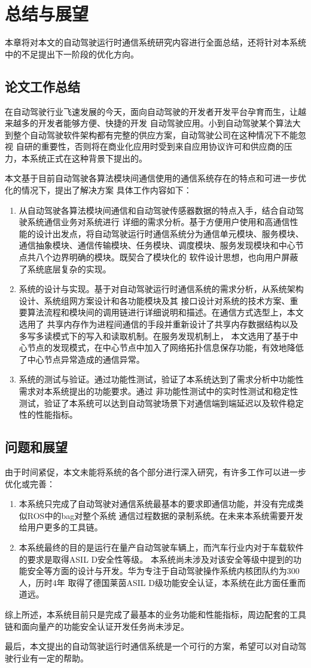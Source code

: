 \chapter{总结与展望}
本章将对本文的自动驾驶运行时通信系统研究内容进行全面总结，还将针对本系统中的不足提出下一阶段的优化方向。
\section{论文工作总结}
在自动驾驶行业飞速发展的今天，面向自动驾驶的开发者开发平台孕育而生，让越来越多的开发者能够方便、快捷的开发
自动驾驶应用。小到自动驾驶某个算法大到整个自动驾驶软件架构都有完整的供应方案，自动驾驶公司在这种情况下不能忽视
自研的重要性，否则将在商业化应用时受到来自应用协议许可和供应商的压力，本系统正式在这种背景下提出的。

本文基于目前自动驾驶各算法模块间通信使用的通信系统存在的特点和可进一步优化的情况下，提出了解决方案
具体工作内容如下：
\begin{enumerate}
    \item 从自动驾驶各算法模块间通信和自动驾驶传感器数据的特点入手，结合自动驾驶系统通信业务对系统进行
    详细的需求分析。基于方便用户使用和高通信性能的设计出发点，将自动驾驶运行时通信系统分为通信单元模块、服务模块、
    通信抽象模块、通信传输模块、任务模块、调度模块、服务发现模块和中心节点共八个边界明确的模块。既契合了模块化的
    软件设计思想，也向用户屏蔽了系统底层复杂的实现。
    \item 系统的设计与实现。基于对自动驾驶运行时通信系统的需求分析，从系统架构设计、系统组网方案设计和各功能模块及其
    接口设计对系统的技术方案、重要算法流程和模块间的调用链进行详细说明和描述。在通信方式选型上，本文选用了
    共享内存作为进程间通信的手段并重新设计了共享内存数据结构以及多写多读模式下的写入和读取机制。在服务发现机制上，
    本文选用了基于中心节点的发现模式，在中心节点中加入了网络拓扑信息保存功能，有效地降低了中心节点异常造成的通信异常。
    \item 系统的测试与验证。通过功能性测试，验证了本系统达到了需求分析中功能性需求对本系统提出的功能要求。通过
    非功能性测试中的实时性测试和稳定性测试，验证了本系统可以达到自动驾驶场景下对通信端到端延迟以及软件稳定性的性能指标。
\end{enumerate}

\section{问题和展望}
由于时间紧促，本文未能将系统的各个部分进行深入研究，有许多工作可以进一步优化或完善：
\begin{enumerate}
    \item 本系统只完成了自动驾驶对通信系统最基本的要求即通信功能，并没有完成类似ROS中的bag对整个系统
    通信过程数据的录制系统。在未来本系统需要开发给用户更多的工具链。
    \item 本系统最终的目的是运行在量产自动驾驶车辆上，而汽车行业内对于车载软件的要求是取得ASIL D安全性等级。
    本系统尚未涉及对该安全等级中提到的功能安全等方面的设计与开发。华为专注于自动驾驶操作系统内核团队约为300人，历时4年
    取得了德国莱茵ASIL D级功能安全认证，本系统在此方面任重而道远。
\end{enumerate}

综上所述，本系统目前只是完成了最基本的业务功能和性能指标，周边配套的工具链和面向量产的功能安全认证开发任务尚未涉足。

最后，本文提出的自动驾驶运行时通信系统是一个可行的方案，希望可以对自动驾驶行业有一定的帮助。


